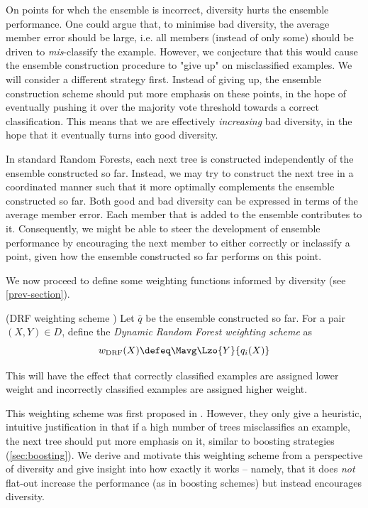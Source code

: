 \documentclass[../main.tex]{subfiles}
\begin{document}
On points for whch the ensemble is incorrect, diversity hurts the ensemble performance. 
One could argue that, to minimise bad diversity, the average member error should be large, i.e. all members (instead of only some) should be driven to \textit{mis}-classify the example. However, we conjecture that this would cause the ensemble construction procedure to "give up" on misclassified examples. We will consider a different strategy first. Instead of giving up, the ensemble construction scheme should put more emphasis on these points, in the hope of eventually pushing it over the majority vote threshold towards a correct classification. This means that we are effectively \textit{increasing} bad diversity, in the hope that it eventually turns into good diversity.

In standard Random Forests, each next tree is constructed independently of the ensemble constructed so far. Instead, we may try to construct the next tree in a coordinated manner such that it more optimally complements the ensemble constructed so far. 
Both good and bad diversity can be expressed in terms of the average member error. Each member that is added to the ensemble contributes to it. Consequently, we might be able to steer the development of ensemble performance by encouraging the next member to either correctly or inclassify a point, given how the ensemble constructed so far performs on this point.



We now proceed to define some weighting functions informed by diversity (see \ref{prev-section}).
\marginnote{
   } 
\begin{definition} (DRF weighting scheme \cite{bernard-drf})
Let $\bar{q}$ be the ensemble constructed so far. For a pair $(X,Y) \in D$, define the \textit{Dynamic Random Forest weighting scheme} as 
$$
w_{\text{DRF}}(X) \defeq \Mavg \Lzo{Y}{q_{i}(X)}
$$
\label{def:drf-weighting-scheme}
\end{definition}
This will have the effect that correctly classified examples are assigned lower weight and incorrectly classified examples are assigned higher weight.  %


This weighting scheme was first proposed in \cite{bernard-drf}. However, they only give a heuristic, intuitive justification in that if a high number of trees misclassifies an example, the next tree should put more emphasis on it, similar to boosting strategies (\ref{sec:boosting}). We derive and motivate this weighting scheme from a perspective of diversity and give insight into how exactly it works -- namely, that it does \textit{not} flat-out increase the performance (as in boosting schemes) but instead encourages diversity.
\end{document}
